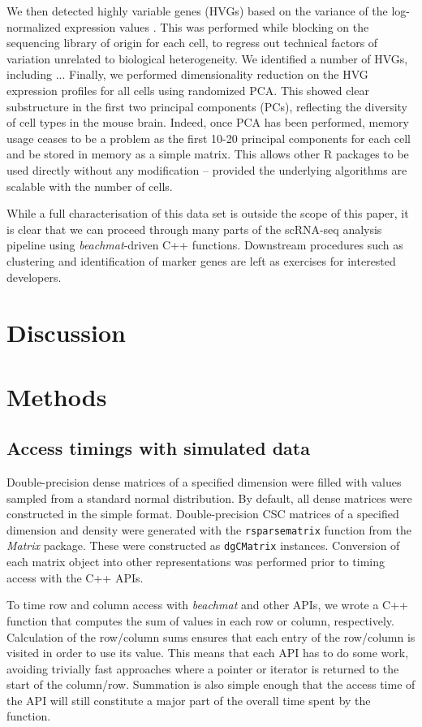 \documentclass[10pt,letterpaper]{article}
\newcommand{\beachmat}{\textit{beachmat}}
\newcommand{\code}[1]{\texttt{#1}}
\begin{document}
We then detected highly variable genes (HVGs) based on the variance of the log-normalized expression values \cite{lun2016stepbystep}.
This was performed while blocking on the sequencing library of origin for each cell, to regress out technical factors of variation unrelated to biological heterogeneity.
We identified a number of HVGs, including ...
Finally, we performed dimensionality reduction on the HVG expression profiles for all cells using randomized PCA.
This showed clear substructure in the first two principal components (PCs), reflecting the diversity of cell types in the mouse brain.
Indeed, once PCA has been performed, memory usage ceases to be a problem as the first 10-20 principal components for each cell and be stored in memory as a simple matrix.
This allows other R packages to be used directly without any modification -- provided the underlying algorithms are scalable with the number of cells.

While a full characterisation of this data set is outside the scope of this paper, it is clear that we can proceed through many parts of the scRNA-seq analysis pipeline using \beachmat{}-driven C++ functions.
Downstream procedures such as clustering and identification of marker genes are left as exercises for interested developers.

\section*{Discussion}

\section*{Methods}

\subsection*{Access timings with simulated data}
Double-precision dense matrices of a specified dimension were filled with values sampled from a standard normal distribution.
By default, all dense matrices were constructed in the simple format.
Double-precision CSC matrices of a specified dimension and density were generated with the \code{rsparsematrix} function from the \textit{Matrix} package. 
These were constructed as \code{dgCMatrix} instances.
Conversion of each matrix object into other representations was performed prior to timing access with the C++ APIs.

To time row and column access with \beachmat{} and other APIs, we wrote a C++ function that computes the sum of values in each row or column, respectively.
Calculation of the row/column sums ensures that each entry of the row/column is visited in order to use its value.
This means that each API has to do some work, avoiding trivially fast approaches where a pointer or iterator is returned to the start of the column/row.
Summation is also simple enough that the access time of the API will still constitute a major part of the overall time spent by the function.
\end{document}
